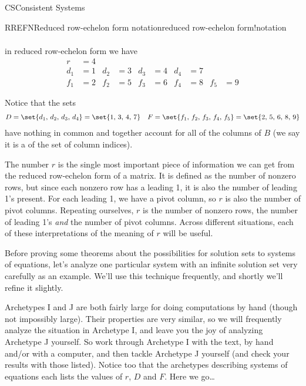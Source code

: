 \begin{subsect}{CS}{Consistent Systems}
\begin{example}{RREFN}{Reduced row-echelon form notation}{reduced row-echelon form!notation}
\begin{para}
\begin{align*}
\end{align*}
in reduced row-echelon form we have
\begin{align*}
r&=4\\
d_1&=1
&
d_2&=3
&
d_3&=4
&
d_4&=7\\
f_1&=2
&
f_2&=5
&
f_3&=6
&
f_4&=8
&
f_5&=9
\end{align*}
\end{para}
%
\begin{para}Notice that the sets
%
\begin{align*}
D&=\set{d_1,\,d_2,\,d_3,\,d_4}=\set{1,\,3,\,4,\,7}
&
F=\set{f_1,\,f_2,\,f_3,\,f_4,\,f_5}=\set{2,\,5,\,6,\,8,\,9}
\end{align*}
%
have nothing in common and together account for all of the columns of $B$ (we say it is a  of the set of column indices).
\end{para}
\end{example}
%
\begin{para}The number $r$ is the single most important piece of information we can get from the reduced row-echelon form of a matrix.  It is defined as the number of nonzero rows, but since each nonzero row has a leading 1, it is also the number of leading 1's present.   For each leading 1, we have a pivot column, so $r$ is also the number of pivot columns.  Repeating ourselves, $r$ is the number of nonzero rows, the number of leading 1's {\em and} the number of pivot columns.  Across different situations, each of these interpretations of the meaning of $r$ will be useful.\end{para}
%
\begin{para}Before proving some theorems about the possibilities for solution sets to systems of equations, let's analyze one particular system with an infinite solution set very carefully as an example.  We'll use this technique frequently, and shortly we'll refine it slightly.\end{para}
%
\begin{para}Archetypes I and J are both fairly large for doing computations by hand (though not impossibly large).  Their properties are very similar, so we will frequently analyze the situation in Archetype I, and leave you the joy of analyzing Archetype J yourself.  So work through Archetype I with the text,  by hand and/or with a computer, and then tackle Archetype J yourself (and check your results with those listed).  Notice too that the archetypes describing systems of equations each lists the values of $r$, $D$ and $F$.  Here we go\dots\end{para}

\end{subsect}
